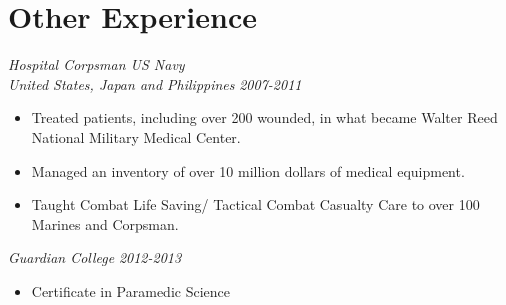 \documentclass[letterpaper]{article}
\begin{document}
\section*{Other Experience}
\begin{multicols}{2}
\textit{Hospital Corpsman US Navy
\\United States, Japan and Philippines}
\vfill
\columnbreak
\textit{2007-2011}
\end{multicols}
\begin{itemize}
    \item Treated patients, including over 200 wounded, in what became Walter Reed National Military Medical Center.
    \item Managed an inventory of over 10 million dollars of medical equipment.
    \item Taught Combat Life Saving/ Tactical Combat Casualty Care to over 100 Marines and Corpsman. 
\end{itemize}

\begin{multicols}{2}
\textit{Guardian College}
\vfill
\columnbreak
\textit{2012-2013}
\end{multicols}
\begin{itemize}
      \item Certificate in Paramedic Science 
\end{itemize}
\end{document}
